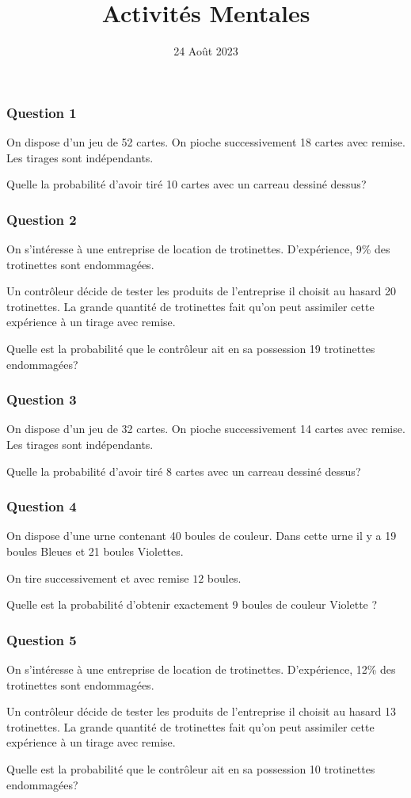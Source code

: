 \documentclass[15pt, mathserif]{beamer}
\title{Activités Mentales}
\date{24 Août 2023}
\begin{document}
\begin{frame}
    \titlepage
\end{frame}

\begin{frame} 
	\frametitle{Question 1}
On dispose d'un jeu de 52 cartes. On pioche successivement 18 cartes avec remise. Les tirages sont indépendants.

\medskip

Quelle la probabilité d'avoir tiré 10 cartes avec un carreau dessiné dessus?\end{frame}


\begin{frame} 
	\frametitle{Question 2}
On s'intéresse à une entreprise de location de trotinettes. D'expérience, 9\% des trotinettes sont  endommagées.

 Un contrôleur décide de tester les produits de l'entreprise il choisit au hasard 20 trotinettes. La grande quantité de trotinettes fait qu'on peut assimiler cette expérience à un tirage avec remise.

\medskip

Quelle est la probabilité que le contrôleur ait en sa possession 19 trotinettes endommagées?\end{frame}


\begin{frame} 
	\frametitle{Question 3}
On dispose d'un jeu de 32 cartes. On pioche successivement 14 cartes avec remise. Les tirages sont indépendants.

\medskip

Quelle la probabilité d'avoir tiré 8 cartes avec un carreau dessiné dessus?\end{frame}


\begin{frame} 
	\frametitle{Question 4}
On dispose d'une urne contenant 40 boules de couleur. Dans cette urne il y a 19 boules Bleues et 21 boules Violettes.

On tire successivement et avec remise $12$ boules.

\medskip

Quelle est la probabilité d'obtenir exactement 9 boules de couleur Violette ?\end{frame}


\begin{frame} 
	\frametitle{Question 5}
On s'intéresse à une entreprise de location de trotinettes. D'expérience, 12\% des trotinettes sont  endommagées.

 Un contrôleur décide de tester les produits de l'entreprise il choisit au hasard 13 trotinettes. La grande quantité de trotinettes fait qu'on peut assimiler cette expérience à un tirage avec remise.

\medskip

Quelle est la probabilité que le contrôleur ait en sa possession 10 trotinettes endommagées?\end{frame}
\end{document}
